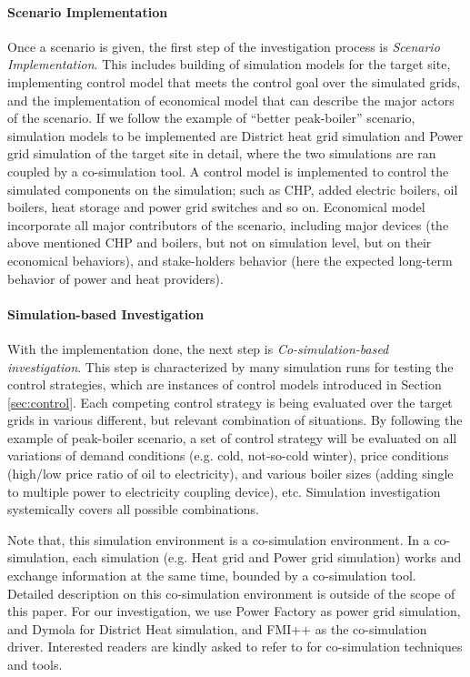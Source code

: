 \documentclass[conference]{IEEEtran}
\begin{document}
\paragraph{Scenario Implementation} 
Once a scenario is given, the first step of the investigation process
is {\em Scenario Implementation}. This includes building of
simulation models for the target site, implementing control model that
meets the control goal over the simulated grids, and the
implementation of economical model that can describe the major actors 
of the scenario. If we follow the example of ``better peak-boiler''
scenario, simulation models to be implemented are District heat grid
simulation and Power grid simulation of the target site in detail,
where the two simulations are ran coupled by a co-simulation
tool. A control model is implemented to control the simulated
components on the simulation; such as CHP, added electric boilers, oil
boilers, heat storage and power grid switches and so on. Economical
model incorporate all major contributors of the scenario, including
major devices (the above mentioned CHP and boilers, but not
on simulation level, but on their economical behaviors), and
stake-holders behavior (here the expected long-term behavior of power
and heat providers).  

\paragraph{Simulation-based Investigation} 
With the implementation done, the next step is {\em
  Co-simulation-based investigation}. This step is characterized by
many simulation runs for testing the control strategies, which are
instances of control models introduced in Section \ref{sec:control}. 
Each competing control strategy is being evaluated over the target
grids in various different, but relevant combination of situations. By
following the example of peak-boiler scenario, a set of control
strategy will be evaluated on all variations of demand conditions
(e.g. cold, not-so-cold winter), price  conditions (high/low price
ratio of oil to electricity), and various boiler sizes (adding single
to multiple power to electricity coupling device), etc. Simulation
investigation systemically covers all possible combinations.  

Note that, this simulation environment is a co-simulation
environment. In a co-simulation, each simulation (e.g. Heat grid
and Power grid simulation) works and exchange information at the same
time, bounded by a co-simulation tool. Detailed description on this
co-simulation environment is outside of the scope of this paper. For
our investigation, we use Power Factory as power grid simulation, and
Dymola for District Heat simulation, and FMI++ as the co-simulation
driver. Interested readers are kindly asked to refer to \cite{} for
co-simulation techniques and tools.   
\end{document}
